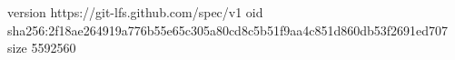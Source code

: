 version https://git-lfs.github.com/spec/v1
oid sha256:2f18ae264919a776b55e65c305a80cd8c5b51f9aa4c851d860db53f2691ed707
size 5592560
